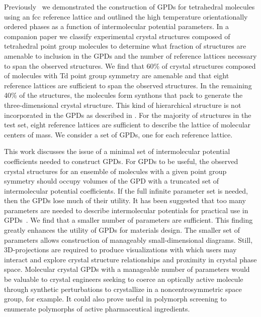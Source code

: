 \documentclass[preprint]{iucr}              %
\begin{document}
Previously~\cite{Mettes04} we demonstrated the construction of GPDs for
tetrahedral molecules using an fcc reference lattice and outlined the high
temperature orientationally ordered phases as a function of intermolecular
potential parameters.  In a companion paper\cite{McClurg09} we classify
experimental crystal structures composed of tetrahedral point group molecules to
determine what fraction of structures are amenable to inclusion in the GPDs and
the number of reference lattices necessary to span the observed structures.  We
find that 60\% of crystal structures composed of molecules with Td point group
symmetry are amenable and that eight reference lattices are sufficient to span
the observed structures.  In the remaining 40\% of the structures, the molecules
form synthons that pack to generate the three-dimensional crystal structure. 
This kind of hierarchical structure is not incorporated in the GPDs as described
in \cite{Mettes04}.  For the majority of structures in the test set, eight
reference lattices are sufficient to describe the lattice of molecular centers
of mass.  We consider a set of GPDs, one for each reference lattice.  

This work discusses the issue of a minimal set of intermolecular potential
coefficients needed to construct GPDs.  For GPDs to be useful, the observed
crystal structures for an ensemble of molecules with a given point group
symmetry should occupy volumes of the GPD with a truncated set of intermolecular
potential coefficients.  If the full infinite parameter set is needed, then the
GPDs lose much of their utility.  It has been suggested that too many parameters
are needed to describe intermolecular potentials for practical use in
GPDs~\cite{Briels80}.  We find that a smaller number of parameters are
sufficient.  This finding greatly enhances the utility of GPDs for materials
design. The smaller set of parameters allows construction of manageably
small-dimensional diagrams.  Still, 3D-projections are required to produce
visualizations with which users may interact and explore crystal structure
relationships and proximity in crystal phase space.  Molecular crystal GPDs with
a manageable number of parameters would be valuable to crystal engineers seeking
to coerce an optically active molecule through synthetic perturbations to
crystallize in a noncentrosymmetric space group, for example. It could also
prove useful in polymorph screening to enumerate polymorphs of active
pharmaceutical ingredients. 
\end{document}
